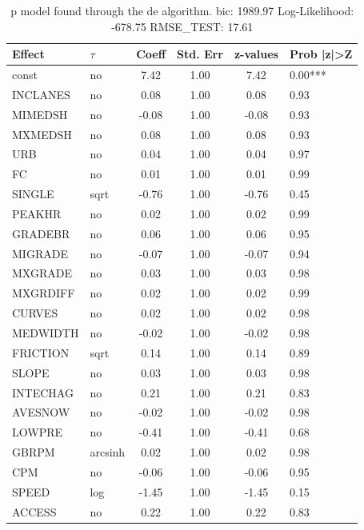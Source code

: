 \begin{table}
	\caption{p model found through the de algorithm. bic: 1989.97 Log-Likelihood: -678.75 RMSE_TEST: 17.61}
	\begin{center}
		\begin{tabular}{|l|l|c|c|c|l|}
			\hline
			Effect & $\tau$ & Coeff & Std. Err & z-values & Prob |z|>Z \\
			\hline
			const & no & 7.42 & 1.00 & 7.42 & 0.00*** \\
			\hline
			INCLANES & no & 0.08 & 1.00 & 0.08 & 0.93 \\
			\hline
			MIMEDSH & no & -0.08 & 1.00 & -0.08 & 0.93 \\
			\hline
			MXMEDSH & no & 0.08 & 1.00 & 0.08 & 0.93 \\
			\hline
			URB & no & 0.04 & 1.00 & 0.04 & 0.97 \\
			\hline
			FC & no & 0.01 & 1.00 & 0.01 & 0.99 \\
			\hline
			SINGLE & sqrt & -0.76 & 1.00 & -0.76 & 0.45 \\
			\hline
			PEAKHR & no & 0.02 & 1.00 & 0.02 & 0.99 \\
			\hline
			GRADEBR & no & 0.06 & 1.00 & 0.06 & 0.95 \\
			\hline
			MIGRADE & no & -0.07 & 1.00 & -0.07 & 0.94 \\
			\hline
			MXGRADE & no & 0.03 & 1.00 & 0.03 & 0.98 \\
			\hline
			MXGRDIFF & no & 0.02 & 1.00 & 0.02 & 0.99 \\
			\hline
			CURVES & no & 0.02 & 1.00 & 0.02 & 0.98 \\
			\hline
			MEDWIDTH & no & -0.02 & 1.00 & -0.02 & 0.98 \\
			\hline
			FRICTION & sqrt & 0.14 & 1.00 & 0.14 & 0.89 \\
			\hline
			SLOPE & no & 0.03 & 1.00 & 0.03 & 0.98 \\
			\hline
			INTECHAG & no & 0.21 & 1.00 & 0.21 & 0.83 \\
			\hline
			AVESNOW & no & -0.02 & 1.00 & -0.02 & 0.98 \\
			\hline
			LOWPRE & no & -0.41 & 1.00 & -0.41 & 0.68 \\
			\hline
			GBRPM & arcsinh & 0.02 & 1.00 & 0.02 & 0.98 \\
			\hline
			CPM & no & -0.06 & 1.00 & -0.06 & 0.95 \\
			\hline
			SPEED & log & -1.45 & 1.00 & -1.45 & 0.15 \\
			\hline
			ACCESS & no & 0.22 & 1.00 & 0.22 & 0.83 \\

\end{tabular}
\end{center}
\end{table}
